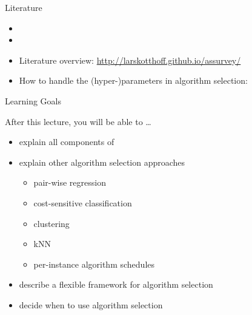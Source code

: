 \begin{frame}[c]{Literature}

\begin{itemize}
  \item {}
  \item {}
  \item Literature overview: \url{http://larskotthoff.github.io/assurvey/}
  \item How to handle the (hyper-)parameters in algorithm selection:\\
\end{itemize}



\end{frame}
\begin{frame}[c]{Learning Goals}

After this lecture, you will be able to \ldots

\begin{itemize}
  \item explain all components of \alert{\satzilla}
  \item explain other algorithm selection approaches
  \begin{itemize}
	  \item \alert{pair-wise regression} 
	  \item \alert{cost-sensitive classification} 
	  \item \alert{clustering} 
	  \item \alert{kNN}
	  \item \alert{per-instance algorithm schedules}
  \end{itemize}
  \item describe a \alert{flexible framework} for algorithm selection
  \item decide \alert{when} to use algorithm selection
\end{itemize}

\end{frame}
